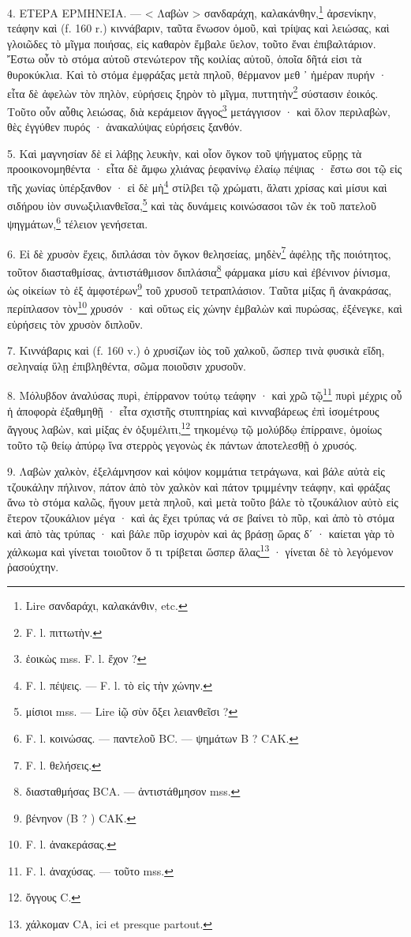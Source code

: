\documentclass[a4paper, 11pt, oneside, polutonikogreek, french]{article}
\begin{document}
4. ΕΤΕΡΑ ΕΡΜΗΝΕΙΑ. --- < Λαβὼν > σανδαράχη, καλακάνθην,\footnote{Lire σανδαράχι, καλακάνθιν, etc.} ἀρσενίκην, τεάφην καὶ (f. 160 r.) κιννάβαριν, ταῦτα ἕνωσον ὁμοῦ, καὶ τρίψας καὶ λειώσας, καὶ γλοιῶδες τὸ μῖγμα ποιήσας, εἰς καθαρὸν ἔμβαλε ὕελον, τοῦτο ἔναι ἐπιβαλτάριον. Ἔστω οὖν τὸ στόμα αὐτοῦ στενώτερον τῆς κοιλίας αὐτοῦ, ὁποῖα δῆτά εἰσι τὰ θυροκύκλια. Καὶ τὸ στόμα ἐμφράξας μετὰ πηλοῦ, θέρμανον μεθ ᾽ ἡμέραν πυρήν · εἶτα δὲ ἀφελὼν τὸν πηλὸν, εὐρήσεις ξηρὸν τὸ μῖγμα, πυττητὴν\footnote{F. l. πιττωτὴν.} σύστασιν ἐοικός. Τοῦτο οὖν αὖθις λειώσας, διὰ κεράμειον ἄγγος\footnote{ἐοικὼς mss. F. l. ἔχον ?} μετάγγισον · καὶ ὅλον περιλαβὼν, θὲς ἐγγύθεν πυρός · ἀνακαλύψας εὑρήσεις ξανθόν.

5. Καὶ μαγνησίαν δὲ εἰ λάβῃς λευκὴν, καὶ οἷον ὄγκον τοῦ ψήγματος εὕρῃς τὰ προοικονομηθέντα · εἶτα δὲ ἄμφω χλιάνας ῥεφανίνῳ ἐλαίῳ πέψιας · ἔστω σοι τῷ εἰς τῆς χωνίας ὑπέρξανθον · εἰ δὲ μὴ\footnote{F. l. πέψεις. --- F. l. τὸ εἰς τὴν χώνην.} στίλβει τῷ χρώματι, ἅλατι χρίσας καὶ μίσυι καὶ σιδήρου ἰὸν συνωξιλιανθεῖσα,\footnote{μίσιοι mss. --- Lire ἰῷ σὺν ὄξει λειανθεῖσι ?} καὶ τὰς δυνάμεις κοινώσασοι τῶν ἐκ τοῦ πατελοῦ ψηγμάτων,\footnote{F. l. κοινώσας. --- παντελοῦ BC. --- ψημάτων B ? CAK.} τέλειον γενήσεται.

6. Εἰ δὲ χρυσὸν ἔχεις, διπλάσαι τὸν ὄγκον θελησείας, μηδὲν\footnote{F. l. θελήσεις.} ἀφέλῃς τῆς ποιότητος, τοῦτον διασταθμίσας, ἀντιστάθμισον διπλάσια\footnote{διασταθμήσας BCA. --- ἀντιστάθμησον mss.} φάρμακα μίσυ καὶ ἐβένινον ῥίνισμα, ὡς οἰκείων τὸ ἐξ ἀμφοτέρων\footnote{βένηνον (B ? ) CAΚ.} τοῦ χρυσοῦ τετραπλάσιον. Ταῦτα μίξας ἢ ἀνακράσας, περίπλασον τὸν\footnote{F. l. ἀνακεράσας.} χρυσόν · καὶ οὕτως εἰς χώνην ἐμβαλὼν καὶ πυρώσας, ἐξένεγκε, καὶ εὑρήσεις τὸν χρυσὸν διπλοῦν.

7. Κιννάβαρις καὶ (f. 160 v.) ὁ χρυσίζων ἰὸς τοῦ χαλκοῦ, ὥσπερ τινὰ φυσικὰ εἴδη, σεληναίᾳ ὕλῃ ἐπιβληθέντα, σῶμα ποιοῦσιν χρυσοῦν.

8. Μόλυβδον ἀναλύσας πυρὶ, ἐπίρρανον τούτῳ τεάφην · καὶ χρῶ τῷ\footnote{F. l. ἀναχύσας. --- τοῦτο mss.} πυρὶ μέχρις οὗ ἡ ἀποφορὰ ἐξαθμηθῇ · εἶτα σχιστῆς στυπτηρίας καὶ κινναβάρεως ἐπὶ ἰσομέτρους ἄγγους λαβὼν, καὶ μίξας ἐν ὀξυμέλιτι,\footnote{ὄγγους C.} τηκομένῳ τῷ μολύβδῳ ἐπίρραινε, ὁμοίως τοῦτο τῷ θείῳ ἀπύρῳ ἵνα στερρὸς γεγονὼς ἐκ πάντων ἀποτελεσθῇ ὁ χρυσός.

9. Λαβὼν χαλκὸν, ἐξελάμνησον καὶ κόψον κομμάτια τετράγωνα, καὶ βάλε αὐτὰ εἰς τζουκάλην πήλινον, πάτον ἀπὸ τὸν χαλκὸν καὶ πάτον τριμμένην τεάφην, καὶ φράξας ἄνω τὸ στόμα καλῶς, ἤγουν μετὰ πηλοῦ, καὶ μετὰ τοῦτο βάλε τὸ τζουκάλιον αὐτὸ εἰς ἕτερον τζουκάλιον μέγα · καὶ ἀς ἔχει τρύπας νά σε βαίνει τὸ πῦρ, καὶ ἀπὸ τὸ στόμα καὶ ἀπὸ τὰς τρύπας · καὶ βάλε πῦρ ἰσχυρὸν καὶ ἀς βράσῃ ὥρας δʹ · καίεται γὰρ τὸ χάλκωμα καὶ γίνεται τοιοῦτον ὅ τι τρίβεται ὥσπερ ἅλας\footnote{χάλκομαν CA, ici et presque partout.} · γίνεται δὲ τὸ λεγόμενον ῥασούχτην.
\end{document}
